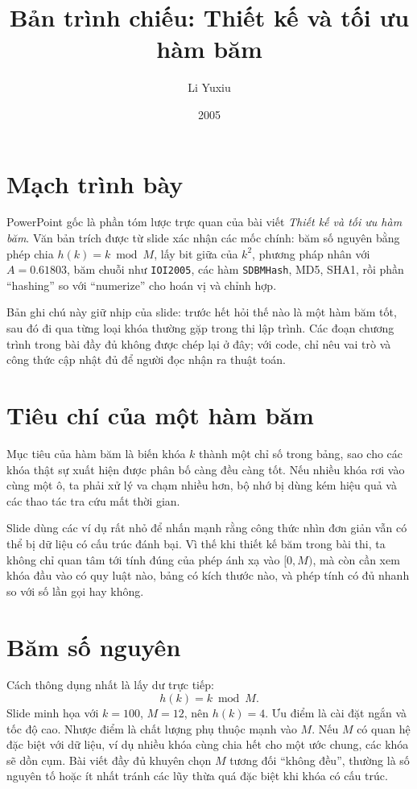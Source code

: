 \documentclass[11pt]{article}
\title{Bản trình chiếu: Thiết kế và tối ưu hàm băm}
\author{Li Yuxiu}
\date{2005}
\begin{document}
\maketitle


\section{Mạch trình bày}

PowerPoint gốc là phần tóm lược trực quan của bài viết \emph{Thiết kế và tối
ưu hàm băm}. Văn bản trích được từ slide xác nhận các mốc chính: băm số
nguyên bằng phép chia \(h(k)=k\bmod M\), lấy bit giữa của \(k^2\), phương
pháp nhân với \(A=0.61803\), băm chuỗi như \texttt{IOI2005}, các hàm
\texttt{SDBMHash}, MD5, SHA1, rồi phần ``hashing'' so với ``numerize'' cho
hoán vị và chỉnh hợp.

Bản ghi chú này giữ nhịp của slide: trước hết hỏi thế nào là một hàm băm tốt,
sau đó đi qua từng loại khóa thường gặp trong thi lập trình. Các đoạn chương
trình trong bài đầy đủ không được chép lại ở đây; với code, chỉ nêu vai trò
và công thức cập nhật đủ để người đọc nhận ra thuật toán.

\section{Tiêu chí của một hàm băm}

Mục tiêu của hàm băm là biến khóa \(k\) thành một chỉ số trong bảng, sao cho
các khóa thật sự xuất hiện được phân bố càng đều càng tốt. Nếu nhiều khóa rơi
vào cùng một ô, ta phải xử lý va chạm nhiều hơn, bộ nhớ bị dùng kém hiệu quả
và các thao tác tra cứu mất thời gian.

Slide dùng các ví dụ rất nhỏ để nhấn mạnh rằng công thức nhìn đơn giản vẫn có
thể bị dữ liệu có cấu trúc đánh bại. Vì thế khi thiết kế băm trong bài thi,
ta không chỉ quan tâm tới tính đúng của phép ánh xạ vào \([0,M)\), mà còn cần
xem khóa đầu vào có quy luật nào, bảng có kích thước nào, và phép tính có đủ
nhanh so với số lần gọi hay không.

\section{Băm số nguyên}

Cách thông dụng nhất là lấy dư trực tiếp:
\[
  h(k)=k\bmod M.
\]
Slide minh họa với \(k=100\), \(M=12\), nên \(h(k)=4\). Ưu điểm là cài đặt
ngắn và tốc độ cao. Nhược điểm là chất lượng phụ thuộc mạnh vào \(M\). Nếu
\(M\) có quan hệ đặc biệt với dữ liệu, ví dụ nhiều khóa cùng chia hết cho một
ước chung, các khóa sẽ dồn cụm. Bài viết đầy đủ khuyên chọn \(M\) tương đối
``không đều'', thường là số nguyên tố hoặc ít nhất tránh các lũy thừa quá đặc
biệt khi khóa có cấu trúc.
\end{document}
